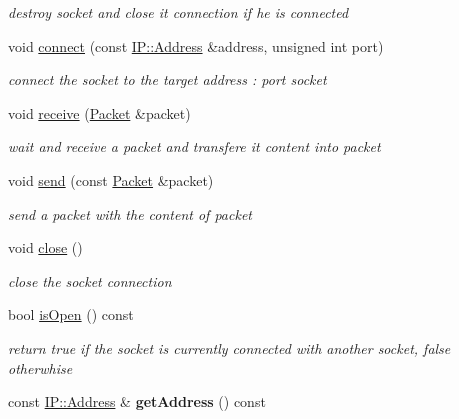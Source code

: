 \begin{DoxyCompactItemize}
\begin{DoxyCompactList}\small\item\em destroy socket and close it connection if he is connected \end{DoxyCompactList}\item 
void \hyperlink{classFTP_1_1TCP_1_1Socket_a220e0105754cdf9378411b24809a4f04}{connect} (const \hyperlink{classFTP_1_1IP_1_1Address}{I\+P\+::\+Address} \&address, unsigned int port)
\begin{DoxyCompactList}\small\item\em connect the socket to the target \textquotesingle{}address\textquotesingle{} \+: \textquotesingle{}port\textquotesingle{} socket \end{DoxyCompactList}\item 
void \hyperlink{classFTP_1_1TCP_1_1Socket_a1a06bb837f2a2d82f3477ecf4da373c7}{receive} (\hyperlink{classFTP_1_1Packet}{Packet} \&packet)
\begin{DoxyCompactList}\small\item\em wait and receive a packet and transfere it content into \textquotesingle{}packet\textquotesingle{} \end{DoxyCompactList}\item 
void \hyperlink{classFTP_1_1TCP_1_1Socket_a7ebcedc1c8baba1a838bdb46babea2eb}{send} (const \hyperlink{classFTP_1_1Packet}{Packet} \&packet)
\begin{DoxyCompactList}\small\item\em send a packet with the content of \textquotesingle{}packet\textquotesingle{} \end{DoxyCompactList}\item 
\hypertarget{classFTP_1_1TCP_1_1Socket_a783815d519b4f76ac7f25e946e8be21e}{}void \hyperlink{classFTP_1_1TCP_1_1Socket_a783815d519b4f76ac7f25e946e8be21e}{close} ()\label{classFTP_1_1TCP_1_1Socket_a783815d519b4f76ac7f25e946e8be21e}

\begin{DoxyCompactList}\small\item\em close the socket connection \end{DoxyCompactList}\item 
\hypertarget{classFTP_1_1TCP_1_1Socket_a9323b1947771c55468a303199742a840}{}bool \hyperlink{classFTP_1_1TCP_1_1Socket_a9323b1947771c55468a303199742a840}{is\+Open} () const \label{classFTP_1_1TCP_1_1Socket_a9323b1947771c55468a303199742a840}

\begin{DoxyCompactList}\small\item\em return true if the socket is currently connected with another socket, false otherwhise \end{DoxyCompactList}\item 
\hypertarget{classFTP_1_1TCP_1_1Socket_a79f3892a2088f566286baf5e4e89f939}{}const \hyperlink{classFTP_1_1IP_1_1Address}{I\+P\+::\+Address} \& {\bfseries get\+Address} () const \label{classFTP_1_1TCP_1_1Socket_a79f3892a2088f566286baf5e4e89f939}

\end{DoxyCompactItemize}
